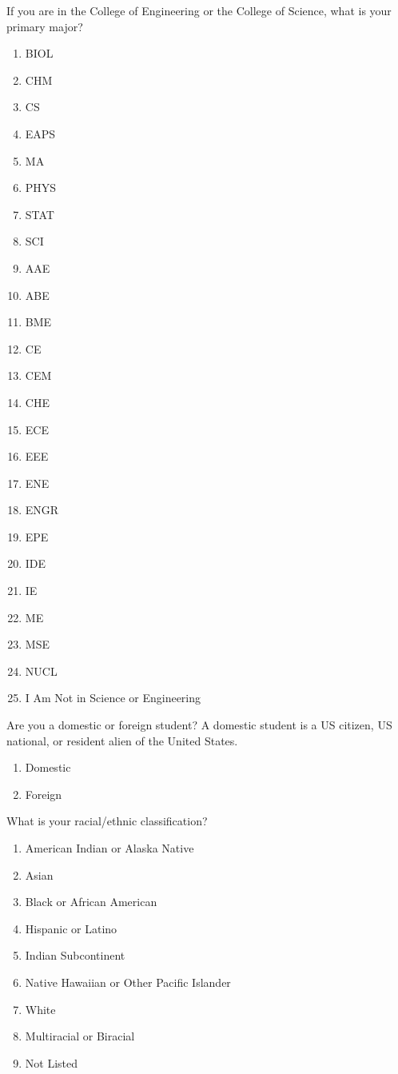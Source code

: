 If you are in the College of Engineering or the College of Science, what is your primary major?

\begin{enumerate}
	\item BIOL
	\item CHM
	\item CS
	\item EAPS
	\item MA
	\item PHYS
	\item STAT
	\item SCI
	\item AAE
	\item ABE
	\item BME
	\item CE
	\item CEM
	\item CHE
	\item ECE
	\item EEE
	\item ENE
	\item ENGR
	\item EPE
	\item IDE
	\item IE
	\item ME
	\item MSE
	\item NUCL
	\item I Am Not in Science or Engineering
\end{enumerate}

Are you a domestic or foreign student? A domestic student is a US citizen, US national, or resident alien of the United States.

\begin{enumerate}
	\item Domestic
	\item Foreign
\end{enumerate}

What is your racial/ethnic classification?

\begin{enumerate}
	\item American Indian or Alaska Native
	\item Asian
	\item Black or African American
	\item Hispanic or Latino
	\item Indian Subcontinent
	\item Native Hawaiian or Other Pacific Islander
	\item White
	\item Multiracial or Biracial
	\item Not Listed
\end{enumerate}

